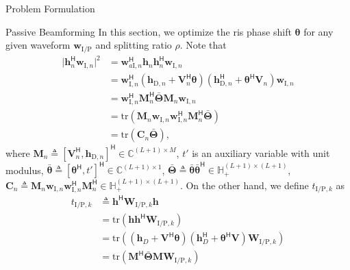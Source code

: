 \begin{section}{Problem Formulation}
	\begin{subsection}{Passive Beamforming}
		In this section, we optimize the \gls{ris} phase shift $\boldsymbol{\theta}$ for any given waveform $\mathbf{w}_{\mathrm{I/P}}$ and splitting ratio $\rho$. Note that
		\begin{align}
			\lvert \mathbf{h}_{n}^\mathsf{H}\mathbf{w}_{\mathrm{I},n} \rvert^2
			& = \mathbf{w}_{a\mathrm{I},n}^\mathsf{H}\mathbf{h}_n\mathbf{h}_n^\mathsf{H}\mathbf{w}_{\mathrm{I},n}\nonumber\\
			& = \mathbf{w}_{\mathrm{I},n}^\mathsf{H}(\mathbf{h}_{\mathrm{D},n}+\mathbf{V}_n^\mathsf{H}\boldsymbol{\theta})(\mathbf{h}_{\mathrm{D},n}^\mathsf{H}+\boldsymbol{\theta}^\mathsf{H}\mathbf{V}_n)\mathbf{w}_{\mathrm{I},n}\nonumber\\
			& = \mathbf{w}_{\mathrm{I},n}^\mathsf{H}\mathbf{M}_n^\mathsf{H}\bar{\mathbf{\Theta}}\mathbf{M}_n\mathbf{w}_{\mathrm{I},n}\nonumber\\
			& = \mathrm{tr}(\mathbf{M}_n\mathbf{w}_{\mathrm{I},n}\mathbf{w}_{\mathrm{I},n}^\mathsf{H}\mathbf{M}_n^\mathsf{H}\bar{\mathbf{\Theta}})\nonumber\\
			& = \mathrm{tr}(\mathbf{C}_n\bar{\mathbf{\Theta}}),
		\end{align}
		where $\mathbf{M}_n \triangleq [\mathbf{V}_n^\mathsf{H}, \mathbf{h}_{\mathrm{D},n}]^\mathsf{H} \in \mathbb{C}^{(L+1) \times M}$, $t'$ is an auxiliary variable with unit modulus, $\bar{\boldsymbol{\theta}} \triangleq [\boldsymbol{\theta}^\mathsf{H}, t']^\mathsf{H} \in \mathbb{C}^{(L+1) \times 1}$, $\bar{\mathbf{\Theta}} \triangleq \bar{\boldsymbol{\theta}}\bar{\boldsymbol{\theta}}^\mathsf{H} \in \mathbb{H}_+^{(L+1) \times (L+1)}$, $\mathbf{C}_n \triangleq \mathbf{M}_n\mathbf{w}_{\mathrm{I},n}\mathbf{w}_{\mathrm{I},n}^\mathsf{H}\mathbf{M}_n^\mathsf{H} \in \mathbb{H}_+^{(L+1)\times(L+1)}$. On the other hand, we define $t_{\mathrm{I/P},k}$ as
		\begin{align}
			t_{\mathrm{I/P},k}
			& \triangleq \mathbf{h}^\mathsf{H}\mathbf{W}_{\mathrm{I/P},k}\mathbf{h}\nonumber\\
			& = \mathrm{tr}(\mathbf{h}\mathbf{h}^\mathsf{H}\mathbf{W}_{\mathrm{I/P},k})\nonumber\\
			& = \mathrm{tr}\left((\mathbf{h}_{D}+\mathbf{V}^\mathsf{H}\boldsymbol{\theta})(\mathbf{h}_{D}^\mathsf{H}+\boldsymbol{\theta}^\mathsf{H}\mathbf{V})\mathbf{W}_{\mathrm{I/P},k}\right)\nonumber\\
			& = \mathrm{tr}(\mathbf{M}^\mathsf{H}\bar{\mathbf{\Theta}}\mathbf{M}\mathbf{W}_{\mathrm{I/P},k})\nonumber\\

\end{align}
\end{subsection}
\end{section}
